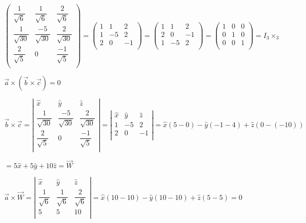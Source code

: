 \documentclass[fleqn]{article}
\begin{document}
\begin{enumerate}
\noindent
$\displaystyle
  \begin{pmatrix}
    \dfrac{1}{\sqrt{6}} & \dfrac{1}{\sqrt{6}} & \dfrac{2}{\sqrt{6}}  \\
    \dfrac{1}{\sqrt{30}} & \dfrac{-5}{\sqrt{30}} & \dfrac{2}{\sqrt{30}} \\ 
    \dfrac{2}{\sqrt{5}} & 0 & \dfrac{-1}{\sqrt{5}} \\ 
  \end{pmatrix}
  =
  \begin{pmatrix}
    1 & 1 & 2\\
    1 & -5 & 2 \\ 
    2 & 0 & -1 \\ 
  \end{pmatrix}
  = 
  \begin{pmatrix}
    1 & 1 & 2\\
    2 & 0 & -1\\ 
    1 & -5 & 2\\ 
  \end{pmatrix}
  = 
  \begin{pmatrix}
    1 & 0 & 0\\
    0 & 1 & 0\\ 
    0 & 0 & 1\\ 
  \end{pmatrix}
  =
  I_3\times_3
$

\bigbreak


$
\overrightarrow{a}\times(\overrightarrow{b}\times\overrightarrow{c})=0
$

$
\overrightarrow{b}\times\overrightarrow{c}
=
\left|
\begin{matrix}
  \hat{x} & \hat{y} & \hat{z} \\
  \dfrac{1}{\sqrt{30}} & \dfrac{-5}{\sqrt{30}} & \dfrac{2}{\sqrt{30}} \\ 
  \dfrac{2}{\sqrt{5}} & 0 & \dfrac{-1}{\sqrt{5}} \\ 
\end{matrix}
\right|
=
\left|
\begin{matrix}
  \hat{x} & \hat{y} & \hat{z} \\
  1 & -5 & 2 \\ 
  2 & 0 & -1 \\ 
\end{matrix}
\right|
=
\hat{x}(5-0)-\hat{y}(-1-4)+\hat{z}(0-(-10))
$

$
=
5\hat{x}+5\hat{y}+10\hat{z}
=\overrightarrow{W}
$


$
\overrightarrow{a}\times\overrightarrow{W}
=
\left|
\begin{matrix}
  \hat{x} & \hat{y} & \hat{z} \\
  \dfrac{1}{\sqrt{6}} & \dfrac{1}{\sqrt{6}} & \dfrac{2}{\sqrt{6}}  \\ 
  5 & 5 & 10 \\ 
\end{matrix}
\right|
=
\hat{x}(10-10)-\hat{y}(10-10)+\hat{z}(5-5)
=
0
$






\end{enumerate}
\end{document}
